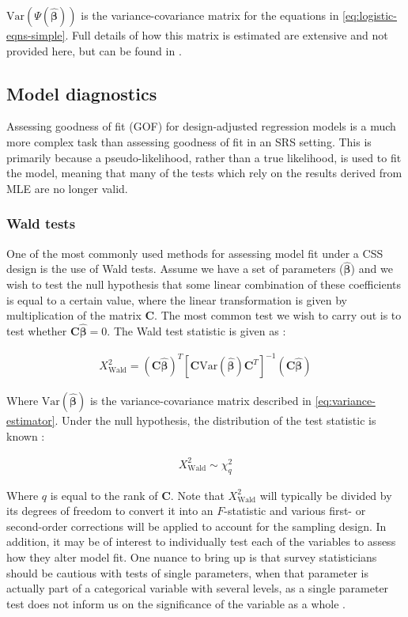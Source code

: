 $\text{Var}(\Psi(\hat{\bm{\beta}}))$ is the variance-covariance matrix for the equations in \autoref{eq:logistic-eqns-simple}. Full details of how this matrix is estimated are extensive and not provided here, but can be found in \citet{binder1983}.

\subsection{Model diagnostics}

Assessing goodness of fit (GOF) for design-adjusted regression models is a much more complex task than assessing goodness of fit in an SRS setting. This is primarily because a pseudo-likelihood, rather than a true likelihood, is used to fit the model, meaning that many of the tests which rely on the results derived from MLE are no longer valid.

\subsubsection{Wald tests}

One of the most commonly used methods for assessing model fit under a CSS design is the use of Wald tests. Assume we have a set of parameters ($\bm{\hat{\beta}}$) and we wish to test the null hypothesis that some linear combination of these coefficients is equal to a certain value, where the linear transformation is given by multiplication of the matrix $\mathbf{C}$. The most common test we wish to carry out is to test whether $\mathbf{C} \bm{\hat{\beta}} = 0$. The Wald test statistic is given as \citep{heeringa2017}:

\begin{align}
\label{eq:wald}
X^{2}_{\text{Wald}} = (\mathbf{C} \bm{\hat{\beta}})^{T} [ \mathbf{C} \text{Var}(\hat{\bm{\beta}}) \mathbf{C}^{T} ] ^ {-1} (\mathbf{C} \bm{\hat{\beta}})
\end{align}

Where $\text{Var}(\hat{\bm{\beta}})$ is the variance-covariance matrix described in \autoref{eq:variance-estimator}. Under the null hypothesis, the distribution of the test statistic is known \citep{heeringa2017}:

\begin{align}
\label{eq:wald-distribution}
X^{2}_{\text{Wald}} \sim \chi^{2}_{q}
\end{align}

Where $q$ is equal to the rank of $\mathbf{C}$. Note that $X^{2}_{\text{Wald}}$ will typically be divided by its degrees of freedom to convert it into an $F$-statistic and various first- or second-order corrections will be applied to account for the sampling design. In addition, it may be of interest to individually test each of the variables to assess how they alter model fit. One nuance to bring up is that survey statisticians should be cautious with tests of single parameters, when that parameter is actually part of a categorical variable with several levels, as a single parameter test does not inform us on the significance of the variable as a whole \citep{heeringa2017}.

